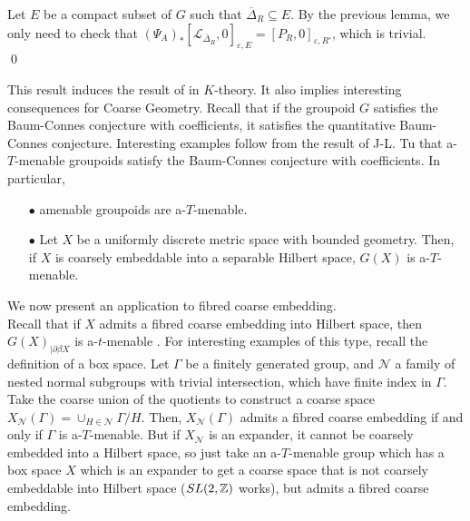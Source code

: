 \begin{dem}
Let $E$ be a compact subset of $G$ such that $\overline \Delta_R \subseteq E$.
By the previous lemma, we only need to check that $(\Psi_A)_*[\mathcal L_{\overline \Delta_R},0]_{\varepsilon,E} = [P_R,0]_{\varepsilon, R'} $, which is trivial.\\
\qed
\end{dem}

This result induces the result of \cite{SkTuYu} in $K$-theory. It also implies interesting consequences for Coarse Geometry. Recall that if the groupoid $G$ satisfies the Baum-Connes conjecture with coefficients, it satisfies the quantitative Baum-Connes conjecture. Interesting examples follow from the result of J-L. Tu \cite{TuThese} that a-$T$-menable groupoids satisfy the Baum-Connes conjecture with coefficients. In particular, \\

\begin{itemize}
\item[$\bullet$] amenable groupoids are a-$T$-menable.\\
\item[$\bullet$] Let $X$ be a uniformly discrete metric space with bounded geometry. Then, if $X$ is coarsely embeddable into a separable Hilbert space, $G(X)$ is a-$T$-menable.\cite{SkTuYu} \\
\end{itemize}

We now present an application to fibred coarse embedding.\\

Recall that if $X$ admits a fibred coarse embedding into Hilbert space, then $G(X)_{|\partial \beta X}$ is a-$t$-menable \cite{FinnSellFibred}. For interesting examples of this type, recall the definition of a box space. Let $\Gamma$ be a finitely generated group, and $\mathcal N$ a family of nested normal subgroups with trivial intersection, which have finite index in $\Gamma$. Take the coarse union of the quotients to construct a coarse space $X_{\mathcal N}(\Gamma)= \cup_{H\in \mathcal N } \Gamma/ H$. Then, $X_{\mathcal N}(\Gamma)$ admits a fibred coarse embedding if and only if $\Gamma$ is a-$T$-menable. But if $X_{\mathcal N}$ is an expander, it cannot be coarsely embedded into a Hilbert space, so just take an a-$T$-menable group which has a box space $X$ which is an expander to get a coarse space that is not coarsely embeddable into Hilbert space ($SL(2,\mathbb Z)$ works), but admits a fibred coarse embedding.\\

